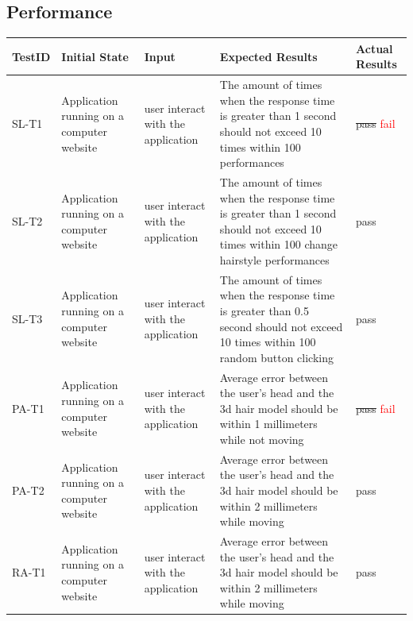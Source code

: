 \documentclass[12pt, titlepage]{article}
\begin{document}
\subsection{Performance}
\begin{tabular}{ |p{2cm}| p{3cm} |p{4cm}| p{4cm}|p{2cm}|  }
\hline
 TestID & Initial State & Input & Expected Results & Actual Results\\ 
\hline
 SL-T1 & Application running on a computer website & user interact with the application & The amount of times when the response time is greater than 1 second should not exceed 10 times within 100 performances  & \sout{pass} \textcolor{red}{fail}\\
  \hline
 SL-T2 & Application running on a computer website & user interact with the application & The amount of times when the response time is greater than 1 second should not exceed 10 times within 100 change hairstyle performances  & pass\\
 \hline
 SL-T3 & Application running on a computer website & user interact with the application & The amount of times when the response time is greater than 0.5 second should not exceed 10 times within 100 random button clicking  & pass\\
  \hline
 PA-T1 & Application running on a computer website & user interact with the application & Average error between the user's head and the 3d hair model should be within 1 millimeters while not moving  & \sout{pass} \textcolor{red}{fail}\\
 \hline
 PA-T2 & Application running on a computer website & user interact with the application & Average error between the user's head and the 3d hair model should be within 2 millimeters while moving  & pass\\
 \hline
 RA-T1 & Application running on a computer website & user interact with the application & Average error between the user's head and the 3d hair model should be within 2 millimeters while moving  & pass\\
 \hline
 \end{tabular}
\end{document}
